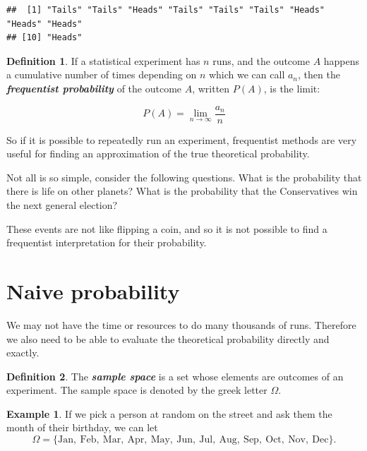 \documentclass[
]{book}
\theoremstyle{definition}
\newtheorem{definition}{Definition}[chapter]
\theoremstyle{definition}
\newtheorem{example}{Example}[chapter]
\theoremstyle{definition}
\theoremstyle{definition}
\theoremstyle{remark}
\begin{document}
\begin{verbatim}
##  [1] "Tails" "Tails" "Heads" "Tails" "Tails" "Tails" "Heads" "Heads" "Heads"
## [10] "Heads"
\end{verbatim}

\begin{definition}
\protect\hypertarget{def:freq}{}\label{def:freq}If a statistical experiment has \(n\) runs, and the outcome \(A\) happens a cumulative number of times depending on \(n\) which we can call \(a_n\), then the \textbf{\emph{frequentist probability}} of the outcome \(A\), written \(P(A)\), is the limit:

\[P(A) = \lim_{n\to \infty} \frac{a_n}{n}\]
\end{definition}

So if it is possible to repeatedly run an experiment, frequentist methods are very useful for finding an approximation of the true theoretical probability.

Not all is so simple, consider the following questions. What is the probability that there is life on other planets? What is the probability that the Conservatives win the next general election?

These events are not like flipping a coin, and so it is not possible to find a frequentist interpretation for their probability.

\hypertarget{naive-probability}{%
\section{Naive probability}\label{naive-probability}}

We may not have the time or resources to do many thousands of runs. Therefore we also need to be able to evaluate the theoretical probability directly and exactly.

\begin{definition}
\protect\hypertarget{def:samplespace}{}\label{def:samplespace}The \textbf{\emph{sample space}} is a set whose elements are outcomes of an experiment. The sample space is denoted by the greek letter \(\Omega\).
\end{definition}

\begin{example}
\protect\hypertarget{exm:monthspace}{}\label{exm:monthspace}If we pick a person at random on the street and ask them the month of their birthday,
we can let
\[\Omega = \{\text{Jan}, \ \text{Feb}, \ \text{Mar},  \ \text{Apr}, \ \text{May}, \ \text{Jun}, \ \text{Jul}, \ \text{Aug}, \ \text{Sep}, \ \text{Oct}, \ \text{Nov}, \ \text{Dec} \}.\]
\end{example}
\end{document}
